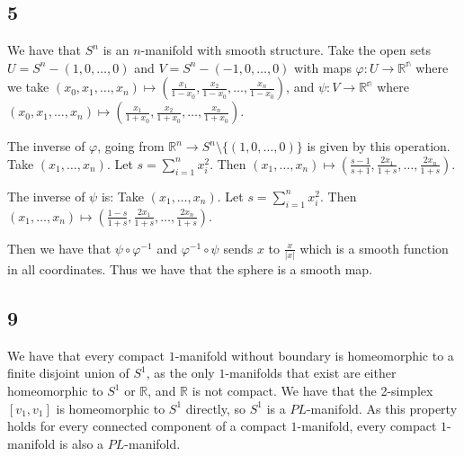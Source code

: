 \documentclass{article}
\theoremstyle{definition}
\numberwithin{theorem}{section}
\numberwithin{equation}{section}
\begin{document}
\subsection{5}
We have that $S^n$ is an $n$-manifold with smooth structure. Take the open sets $U = S^n - (1, 0, \ldots, 0)$ and $V = S^n - (-1, 0, \ldots, 0)$ with maps $\varphi : U \rightarrow \mathbb{R^n}$ where we take $(x_0, x_1, \ldots, x_n) \mapsto (\frac{x_1}{1- x_0}, \frac{x_2}{1- x_0}, \ldots, \frac{x_n}{1- x_0} )$, and $\psi : V \rightarrow \mathbb{R^n}$ where $(x_0, x_1, \ldots, x_n) \mapsto (\frac{x_1}{1+x_0}, \frac{x_2}{1+ x_0}, \ldots, \frac{x_n}{1+x_0} )$. 

The inverse of $\varphi$, going from $\mathbb{R}^n \rightarrow S^n\setminus \{(1, 0, \ldots, 0)\}$ is given by this operation. Take $(x_1, \ldots, x_n)$. Let $s = \sum_{i = 1}^n x_i^2$. Then $(x_1, \ldots, x_n) \mapsto (\frac{s - 1}{s + 1}, \frac{2x_1}{1 + s}, \ldots, \frac{2x_n}{1 + s})$. 

The inverse of $\psi$ is: Take $(x_1, \ldots, x_n)$. Let $s = \sum_{i = 1}^n x_i^2$. Then $(x_1, \ldots, x_n) \mapsto (\frac{1 - s}{1 + s}, \frac{2x_1}{1 + s}, \ldots, \frac{2x_n}{1 + s})$. 

Then we have that $\psi \circ \varphi^{-1}$ and $\varphi^{-1} \circ \psi$ sends $x$ to $ \frac{x}{|x|}$ which is a smooth function in all coordinates. Thus we have that the sphere is a smooth map. 
\subsection{9}
We have that every compact $1$-manifold without boundary is homeomorphic to a finite disjoint union of $S^1$, as the only $1$-manifolds that exist are either homeomorphic to $S^1$ or $\mathbb{R}$, and $\mathbb{R}$ is not compact. We have that the 2-simplex $[v_1, v_1]$ is homeomorphic to $S^1$ directly, so $S^1$ is a $PL$-manifold. As this property holds for every connected component of a compact $1$-manifold, every compact $1$-manifold is also a $PL$-manifold. 
\end{document}
